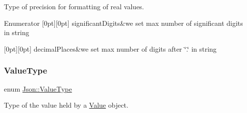 Type of precision for formatting of real values. 

\begin{DoxyEnumFields}{Enumerator}
[0pt][0pt]{}\mbox{\label{namespaceJson_af6e1447a3c43e3a62e11050dd0a11ce8abb30ddeaa820d370a2438dda7a08996a}} 
significant\+Digits&we set max number of significant digits in string \\
\hline

[0pt][0pt]{}\mbox{\label{namespaceJson_af6e1447a3c43e3a62e11050dd0a11ce8aaee1bf0411c550a0bb2996b7b67cae87}} 
decimal\+Places&we set max number of digits after \char`\"{}.\char`\"{} in string \\
\hline

\end{DoxyEnumFields}
\mbox{\label{namespaceJson_a7d654b75c16a57007925868e38212b4e}} 
\subsubsection{\texorpdfstring{Value\+Type}{ValueType}}
{\footnotesize\ttfamily enum \hyperlink{namespaceJson_a7d654b75c16a57007925868e38212b4e}{Json\+::\+Value\+Type}}



Type of the value held by a \hyperlink{classJson_1_1Value}{Value} object. 

